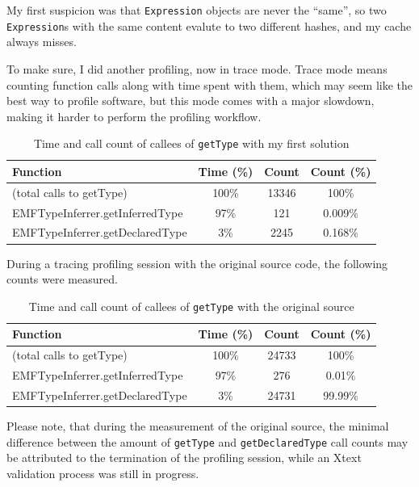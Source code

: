 \documentclass[11pt,a4paper,oneside]{report}
\begin{document}
My first suspicion was that \texttt{Expression} objects are never the ``same'',
so two \texttt{Expression}s with the same content evalute to two different
hashes, and my cache always misses.

To make sure, I did another profiling, now in trace mode. Trace mode means
counting function calls along with time spent with them, which may seem like the
best way to profile software, but this mode comes with a major slowdown, making
it harder to perform the profiling workflow.

\begin{table}[ht]
    \footnotesize
    \centering
    \begin{tabular}{ l c c c }
        \toprule
        Function & Time (\%) & Count & Count (\%) \\
        \midrule
        (total calls to getType) & 100\% & 13346 & 100\% \\
        EMFTypeInferrer.getInferredType & 97\% & 121 & 0.009\% \\
        EMFTypeInferrer.getDeclaredType & 3\% & 2245 & 0.168\% \\
        \bottomrule
    \end{tabular}
    \caption{Time and call count of callees of \texttt{getType} with my first solution}
    \label{tab:first-solution-call-counts}
\end{table}

During a tracing profiling session with the original source code, the following
counts were measured.

\begin{table}[ht]
    \footnotesize
    \centering
    \begin{tabular}{ l c c c }
        \toprule
        Function & Time (\%) & Count & Count (\%) \\
        \midrule
        (total calls to getType) & 100\% & 24733 & 100\% \\
        EMFTypeInferrer.getInferredType & 97\% & 276 & 0.01\% \\
        EMFTypeInferrer.getDeclaredType & 3\% & 24731 & 99.99\% \\
        \bottomrule
    \end{tabular}
    \caption{Time and call count of callees of \texttt{getType} with the original source}
    \label{tab:first-solution-call-counts}
\end{table}

Please note, that during the measurement of the original source, the minimal
difference between the amount of \texttt{getType} and \texttt{getDeclaredType}
call counts may be attributed to the termination of the profiling session, while
an Xtext validation process was still in progress.
\end{document}
